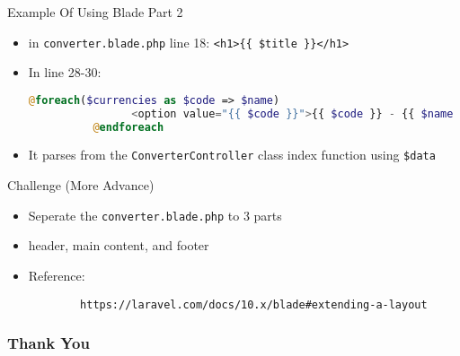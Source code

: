 \documentclass[aspectratio=169, table]{beamer}
\begin{document}
\begin{frame}[fragile]{Example Of Using Blade Part 2}
    \begin{itemize}
        \item in \texttt{converter.blade.php} line 18: \verb|<h1>{{ $title }}</h1>|
        \item In line 28-30:
\begin{lstlisting}[language=PHP]
	@foreach($currencies as $code => $name)
                <option value="{{ $code }}">{{ $code }} - {{ $name }}</option>
          @endforeach
\end{lstlisting}
        \item It parses from the \texttt{ConverterController} class index function using \verb|$data|
    \end{itemize}
\end{frame}

\begin{frame}[fragile]{Challenge (More Advance)}
    \begin{itemize}
        \item Seperate the \texttt{converter.blade.php} to 3 parts
        \item header, main content, and footer
        \item Reference: 
        \begin{verbatim}
        https://laravel.com/docs/10.x/blade#extending-a-layout
        \end{verbatim}
    \end{itemize}
\end{frame}

\begin{frame4}
    \frametitle{Thank You}
\end{frame4}
\end{document}
